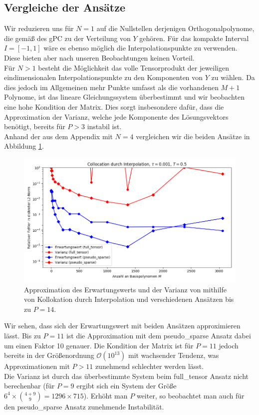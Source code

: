 \subsection{Vergleiche der Ansätze}
Wir reduzieren uns für $N=1$ auf die Nullstellen derjenigen Orthogonalpolynome, die gemäß des gPC zu der Verteilung von $Y$ gehören. Für das kompakte Interval $I=[-1,1]$ wäre es ebenso möglich die \chebyspace Interpolationspunkte zu verwenden. Diese bieten aber nach unseren Beobachtungen keinen Vorteil.\\
Für $N>1$ besteht die Möglichkeit das volle Tensorprodukt der jeweiligen eindimensionalen Interpolationspunkte zu den Komponenten von $Y$ zu wählen. Da dies jedoch im Allgemeinen mehr Punkte umfasst als die vorhandenen $M+1$ Polynome, ist das lineare Gleichungssystem überbestimmt und wir beobachten eine hohe Kondition der Matrix. Dies sorgt insbesondere dafür, dass die Approximation der Varianz, welche jede Komponente des Lösungsvektors benötigt, bereits für $P>3$ instabil ist.\\
Anhand der  aus dem Appendix mit $N=4$ vergleichen wir die beiden Ansätze in Abbildung \ref{fig:Kollokation_trial8}. 
\begin{figure}[!htb]
\centering
\includegraphics[width=\linewidth]{Figures/collocation_mi_trial8_ft_pseudosparse.png}
\caption{Approximation des Erwartungswerts und der Varianz von  mithilfe von Kollokation durch Interpolation und verschiedenen Ansätzen bis zu $P=14$.}
\label{fig:Kollokation_trial8}
\end{figure}
Wir sehen, dass sich der Erwartungswert mit beiden Ansätzen approximieren lässt. Bis zu $P=11$ ist die Approximation mit dem pseudo\_sparse Ansatz dabei um einen Faktor 10 genauer. Die Kondition der Matrix ist für $P=11$ jedoch bereits in der Größenordnung $\mathcal{O}(10^{13})$ mit wachsender Tendenz, was Approximationen mit $P>11$ zunehmend schlechter werden lässt.\\
Die Varianz ist durch das überbestimmte System beim full\_tensor Ansatz nicht berechenbar (für $P=9$ ergibt sich ein System der Größe $6^4\times \binom{4+9}{9} =1296\times 715$). Erhöht man $P$ weiter, so beobachtet man auch für den pseudo\_sparse Ansatz zunehmende Instabilität.

